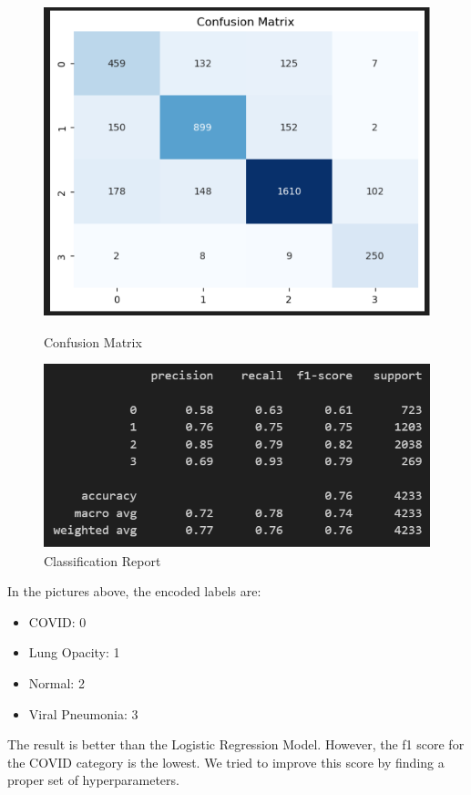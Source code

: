 \documentclass{article}
\begin{document}
\begin{figure}[H]
    \centering
    \begin{minipage}[t]{0.48\textwidth}
        \centering
        \includegraphics[width=\linewidth]{CM_RF_default.png}
        \caption{Confusion Matrix}
        \label{fig:confusion_rf}
    \end{minipage}
    \hfill
    \begin{minipage}[t]{0.48\textwidth}
        \centering
        \includegraphics[width=\linewidth]{CR_RF_default.png}
        \caption{Classification Report}
        \label{fig:classification_rf}
    \end{minipage}
\end{figure}
In the pictures above, the encoded labels are:
\begin{itemize}
    \item COVID: 0
    \item Lung Opacity: 1
    \item Normal: 2
    \item Viral Pneumonia: 3
\end{itemize}
The result is better than the Logistic Regression Model. However, the f1 score for the COVID category is the lowest. We tried to improve this score by finding a proper set of hyperparameters. 
\end{document}
